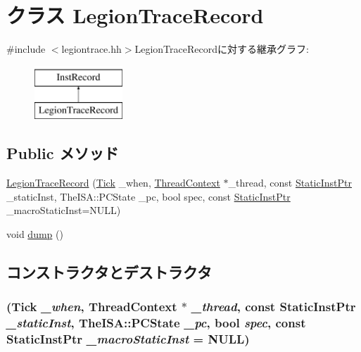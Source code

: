 \hypertarget{classTrace_1_1LegionTraceRecord}{
\section{クラス LegionTraceRecord}
\label{classTrace_1_1LegionTraceRecord}
}


{\ttfamily \#include $<$legiontrace.hh$>$}LegionTraceRecordに対する継承グラフ:\begin{figure}[H]
\begin{center}
\leavevmode
\includegraphics[height=2cm]{classTrace_1_1LegionTraceRecord}
\end{center}
\end{figure}
\subsection*{Public メソッド}
\begin{DoxyCompactItemize}
\item 
\hyperlink{classTrace_1_1LegionTraceRecord_a8add08b26e4c66dcd19ad95f318443c2}{LegionTraceRecord} (\hyperlink{base_2types_8hh_a5c8ed81b7d238c9083e1037ba6d61643}{Tick} \_\-when, \hyperlink{classThreadContext}{ThreadContext} $\ast$\_\-thread, const \hyperlink{classRefCountingPtr}{StaticInstPtr} \_\-staticInst, TheISA::PCState \_\-pc, bool spec, const \hyperlink{classRefCountingPtr}{StaticInstPtr} \_\-macroStaticInst=NULL)
\item 
void \hyperlink{classTrace_1_1LegionTraceRecord_accd2600060dbaee3a3b41aed4034c63c}{dump} ()
\end{DoxyCompactItemize}


\subsection{コンストラクタとデストラクタ}
\hypertarget{classTrace_1_1LegionTraceRecord_a8add08b26e4c66dcd19ad95f318443c2}{
\subsubsection[{LegionTraceRecord}]{ ({\bf Tick} {\em \_\-when}, \/  {\bf ThreadContext} $\ast$ {\em \_\-thread}, \/  const {\bf StaticInstPtr} {\em \_\-staticInst}, \/  TheISA::PCState {\em \_\-pc}, \/  bool {\em spec}, \/  const {\bf StaticInstPtr} {\em \_\-macroStaticInst} = {\ttfamily NULL})}}
\label{classTrace_1_1LegionTraceRecord_a8add08b26e4c66dcd19ad95f318443c2}



